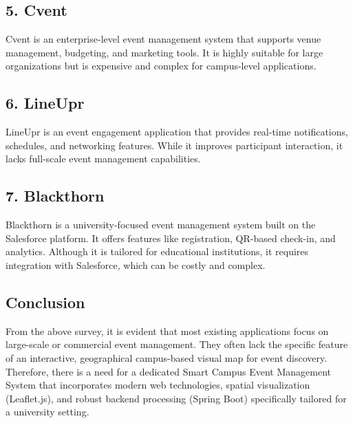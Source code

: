 \documentclass[10pt]{report}
\begin{document}
\subsection*{5. Cvent}
Cvent is an enterprise-level event management system that supports venue management, budgeting, and marketing tools. It is highly suitable for large organizations but is expensive and complex for campus-level applications.

\subsection*{6. LineUpr}
LineUpr is an event engagement application that provides real-time notifications, schedules, and networking features. While it improves participant interaction, it lacks full-scale event management capabilities.

\subsection*{7. Blackthorn}
Blackthorn is a university-focused event management system built on the Salesforce platform. It offers features like registration, QR-based check-in, and analytics. Although it is tailored for educational institutions, it requires integration with Salesforce, which can be costly and complex.

\subsection*{Conclusion}
From the above survey, it is evident that most existing applications focus on large-scale or commercial event management. They often lack the specific feature of an interactive, geographical campus-based visual map for event discovery. Therefore, there is a need for a dedicated Smart Campus Event Management System that incorporates modern web technologies, spatial visualization (Leaflet.js), and robust backend processing (Spring Boot) specifically tailored for a university setting.
\end{document}
